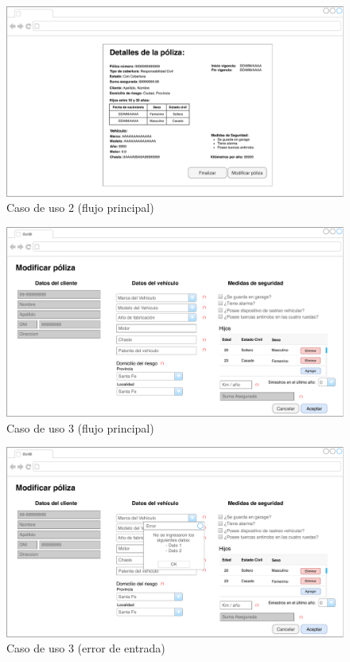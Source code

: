 \documentclass[12pt]{article}
\begin{document}
\vfill
\begin{figure}[h!]
\includegraphics[width=\textwidth]{CU2/CU-026.pdf}
\caption{Caso de uso 2 (flujo principal)}
\end{figure}
\vfill





\vfill
\begin{figure}[h!]
\includegraphics[width=\textwidth]{CU3/CU-031.pdf}
\caption{Caso de uso 3 (flujo principal)}
\end{figure}
\vfill



\vfill
\begin{figure}[h!]
\includegraphics[width=\textwidth]{CU3/CU-032.pdf}
\caption{Caso de uso 3 (error de entrada)}
\end{figure}
\vfill
\end{document}
